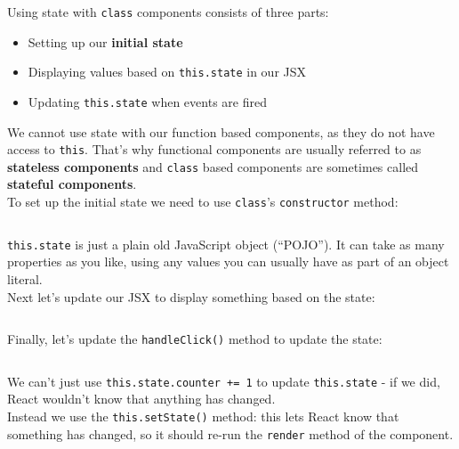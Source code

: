 Using state with \texttt{class} components consists of three parts:

\begin{itemize}
    \item Setting up our \textbf{initial state}
    \item Displaying values based on \texttt{this.state} in our JSX
    \item Updating \texttt{this.state} when events are fired
\end{itemize}

We cannot use state with our function based components, as they do not have access to \texttt{this}. That's why functional components are usually referred to as \textbf{stateless components} and \texttt{class} based components are sometimes called \textbf{stateful components}.
\\

To set up the initial state we need to use \texttt{class}'s \texttt{constructor} method:

\inputminted{jsx}{02/figures/01/05-initial-state.jsx}

\texttt{this.state} is just a plain old JavaScript object (``POJO''). It can take as many properties as you like, using any values you can usually have as part of an object literal.
\\

Next let's update our JSX to display something based on the state:

\inputminted{jsx}{02/figures/01/06-state-jsx.jsx}

Finally, let's update the \texttt{handleClick()} method to update the state:

\inputminted{jsx}{02/figures/01/07-state-change.jsx}

We can't just use \texttt{this.state.counter += 1} to update \texttt{this.state} - if we did, React wouldn't know that anything has changed.
\\

Instead we use the \texttt{this.setState()} method: this lets React know that something has changed, so it should re-run the \texttt{render} method of the component.

